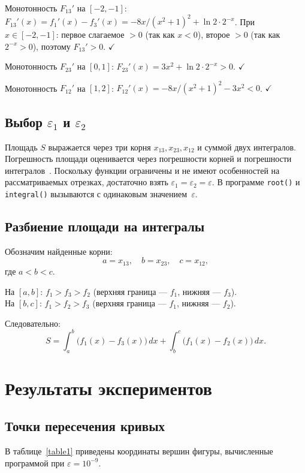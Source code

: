 \documentclass[a4paper,12pt,titlepage,finall]{article}
\begin{document}
Монотонность $F_{13}'$ на $[-2,-1]$:
$F_{13}'(x)=f_1'(x)-f_3'(x)=-8x/(x^2+1)^2+\ln 2\cdot 2^{-x}$.
При $x\in[-2,-1]$: первое слагаемое $>0$ (так как $x<0$),
второе $>0$ (так как $2^{-x}>0$), поэтому $F_{13}'>0$. $\checkmark$

Монотонность $F_{23}'$ на $[0,1]$:
$F_{23}'(x)=3x^2+\ln 2\cdot 2^{-x}>0$. $\checkmark$

Монотонность $F_{12}'$ на $[1,2]$:
$F_{12}'(x)=-8x/(x^2+1)^2-3x^2<0$. $\checkmark$

\subsection{Выбор $\varepsilon_1$ и $\varepsilon_2$}

Площадь $S$ выражается через три корня $x_{13},x_{23},x_{12}$
и суммой двух интегралов.
Погрешность площади оценивается через погрешности корней и погрешности
интегралов~\cite{math}.
Поскольку функции ограничены и не имеют особенностей на рассматриваемых
отрезках, достаточно взять $\varepsilon_1=\varepsilon_2=\varepsilon$.
В программе \texttt{root()} и \texttt{integral()} вызываются с
одинаковым значением~$\varepsilon$.

\subsection{Разбиение площади на интегралы}

Обозначим найденные корни:
\[
    a = x_{13},\quad b = x_{23},\quad c = x_{12},
\]
где $a < b < c$.

На $[a,b]$: $f_1>f_3>f_2$ (верхняя граница — $f_1$, нижняя — $f_3$).\\
На $[b,c]$: $f_1>f_2>f_3$ (верхняя граница — $f_1$, нижняя — $f_2$).

Следовательно:
\[
    S = \int_a^b \bigl(f_1(x)-f_3(x)\bigr)\,dx
      + \int_b^c \bigl(f_1(x)-f_2(x)\bigr)\,dx.
\]

\newpage

\section{Результаты экспериментов}

\subsection{Точки пересечения кривых}

В таблице~\ref{table1} приведены координаты вершин фигуры,
вычисленные программой при $\varepsilon=10^{-9}$.
\end{document}
